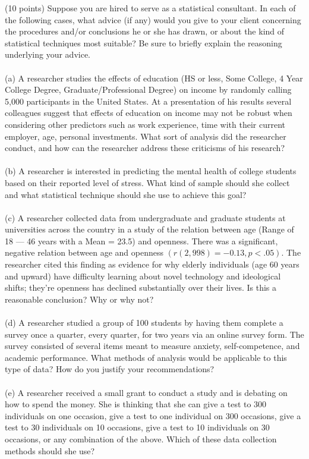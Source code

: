 \documentclass[onecolumn,10pt]{jhwhw}
\begin{document}
\clearpage
\problem{}
(10 points) Suppose you are hired to serve as a statistical consultant. In each of the following cases, what advice (if any) would you give to your client concerning the procedures and/or conclusions he or she has drawn, or about the kind of statistical techniques most suitable? Be sure to briefly explain the reasoning underlying your advice.\\
\\
(a) A researcher studies the effects of education (HS or less, Some College, 4 Year College Degree, Graduate/Professional Degree) on income by randomly calling 5,000 participants in the United States. At a presentation of his results several colleagues suggest that effects of education on income may not be robust when considering other predictors such as work experience, time with their current employer, age, personal investments. What sort of analysis did the researcher conduct, and how can the researcher address these criticisms of his research?\\
\\
(b) A researcher is interested in predicting the mental health of college students based on their reported level of stress. What kind of sample should she collect and what statistical technique should she use to achieve this goal?\\
\\
(c) A researcher collected data from undergraduate and graduate students at universities across the country in a study of the relation between age (Range of 18 --- 46 years with a Mean = 23.5) and openness. There was a significant, negative relation between age and openness $(r(2,998) = -0.13, p < .05)$. The researcher cited this finding as evidence for why elderly individuals (age 60 years and upward) have difficulty learning about novel technology and ideological shifts; they're openness has declined substantially over their lives. Is this a reasonable conclusion? Why or why not?\\
\\
(d) A researcher studied a group of 100 students by having them complete a survey once a quarter, every quarter, for two years via an online survey form. The survey consisted of several items meant to measure anxiety, self-competence, and academic performance. What methods of analysis would be applicable to this type of data? How do you justify your recommendations?\\
\\
(e) A researcher received a small grant to conduct a study and is debating on how to spend the money. She is thinking that she can give a test to 300 individuals on one occasion, give a test to one individual on 300 occasions, give a test to 30 individuals on 10 occasions, give a test to 10 individuals on 30 occasions, or any combination of the above. Which of these data collection methods should she use?
\end{document}
